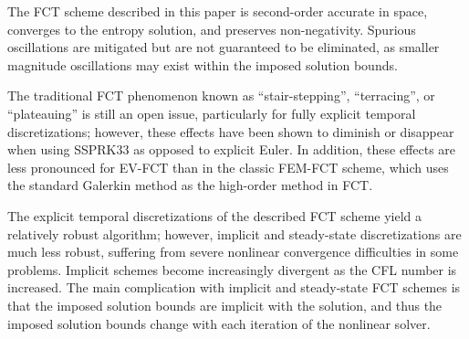 The FCT scheme described in this paper is second-order accurate in space,
converges to the entropy solution, and preserves non-negativity.
Spurious oscillations are mitigated but are not guaranteed to be
eliminated, as smaller magnitude oscillations may exist within the imposed
solution bounds.


The traditional FCT phenomenon known as ``stair-stepping'',
``terracing'', or ``plateauing'' is still an open issue, particularly for
fully explicit temporal discretizations; however, these effects
have been shown to diminish or disappear when using SSPRK33 as opposed
to explicit Euler. In addition, these effects are less pronounced for EV-FCT
than in the classic FEM-FCT scheme, which uses the standard Galerkin method as
the high-order method in FCT.

The explicit temporal discretizations of the described FCT scheme yield a
relatively robust algorithm; however, implicit and steady-state discretizations
are much less robust, suffering from severe nonlinear convergence difficulties
in some problems. Implicit schemes become increasingly divergent as the CFL
number is increased. The main complication with implicit and steady-state
FCT schemes is that the imposed solution bounds are implicit with the solution,
and thus the imposed solution bounds change with each iteration of the
nonlinear solver.
